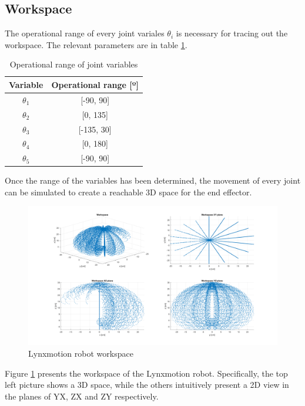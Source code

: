 \documentclass{article}
\begin{document}
\subsection{Workspace}
The operational range of every joint variales $\theta_i$ is necessary for tracing out the workspace.  The relevant parameters are in table \ref{tab:workspace.range}.

\begin{table}[h!]
\centering
\begin{tabular}{ c | c }
Variable		& Operational range [º]\\ \hline
$\theta_1$	& [-90, 90]\\
$\theta_2$	& [0, 135]\\
$\theta_3$	& [-135, 30]\\
$\theta_4$	& [0, 180]\\
$\theta_5$	& [-90, 90]
\end{tabular}
\caption{Operational range of joint variables}
\label{tab:workspace.range}
\end{table}

Once the range of the variables has been determined, the movement of every joint can be simulated to create a reachable 3D space for the end effector.

\begin{figure}
\begin{center}
\includegraphics[width=\textwidth]{images/Workspace}
\caption{Lynxmotion robot workspace}
\label{fig:workpace.workspace}
\end{center}
\end{figure}

Figure \ref{fig:workpace.workspace} presents the workspace of the Lynxmotion robot. Specifically, the top left picture shows a 3D space, while the others intuitively present a 2D view in the planes of YX, ZX and ZY respectively.
\end{document}

